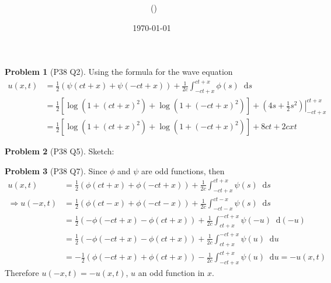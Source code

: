 \documentclass[twoside,11pt]{article}
\title{{\sffamily \Code \ \Ass}}
\author{\sffamily \name \ (\href{mailto:\mail}{\mail})}
\date{\sffamily \today}
\makeatletter
\renewcommand*\d{\mathop{}\!\mathrm{d}}
\theoremstyle{definition}
\newtheorem{problem}{Problem}
\theoremstyle{remark}
\newtheorem*{remark}{Remark}
\renewcommand{\maketitle}{\bgroup\setlength{\parindent}{0pt}
\begin{flushleft}
  \textbf{\Large\@title}

  \@author
\end{flushleft}\egroup
}
\makeatother
\begin{document}
\maketitle
\thispagestyle{title}


\begin{problem}[P38 Q2]
Using the formula for the wave equation
\begin{align*}
    u(x,t) &= \frac{1}{2}(\psi(ct+x) + \psi(-ct+x)) + \frac{1}{2c}\int_{-ct+x}^{ct+x} \phi(s)\d s\\
    &= \frac{1}{2}[\log(1+(ct+x)^2) + \log(1+(-ct+x)^2)] + \left. (4s+\frac{1}{2}s^2) \right |_{-ct+x}^{ct+x}\\
    &= \frac{1}{2}[\log(1+(ct+x)^2) + \log(1+(-ct+x)^2)] + 8ct + 2cxt
\end{align*}
\end{problem}

\begin{problem}[P38 Q5]
Sketch:
\begin{figure}[H]
    \centering
    \resizebox{0.6\textwidth}{!}{}
\end{figure}
\end{problem}

\begin{problem}[P38 Q7]
Since $\phi$ and $\psi$ are odd functions, then
\begin{align*}
    u(x,t) &= \frac{1}{2}(\phi(ct+x) + \phi(-ct+x)) + \frac{1}{2c}\int_{-ct+x}^{ct+x} \psi(s)\d s\\
    \Rightarrow u(-x,t) &=
    \frac{1}{2}(\phi(ct-x) + \phi(-ct-x))
    +\frac{1}{2c}\int_{-ct-x}^{ct-x}\psi(s)\d s\\
    &= \frac{1}{2}(-\phi(-ct+x) - \phi(ct+x)) + 
    \frac{1}{2c}\int_{ct+x}^{-ct+x}\psi(-u)\d (-u)\\
    &= \frac{1}{2}(-\phi(-ct+x) - \phi(ct+x)) + 
    \frac{1}{2c}\int_{ct+x}^{-ct+x}\psi(u)\d u\\
    &= -\frac{1}{2}(\phi(-ct+x) + \phi(ct+x)) -
    \frac{1}{2c}\int_{-ct+x}^{ct+x}\psi(u)\d u = -u(x,t)
\end{align*}
Therefore $u(-x, t)=-u(x,t)$, $u$ an odd function in $x$.
\end{problem}
\end{document}
